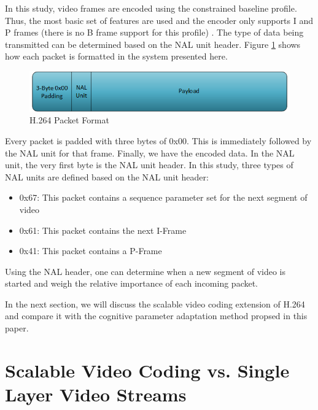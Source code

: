 \documentclass[3p,times,procedia]{elsarticle}
\begin{document}
In this study, video frames are encoded using the constrained baseline profile. Thus, the most basic set of features are used and the encoder only supports I and P frames (there is no B frame support for this profile) \cite{H264Spec}. The type of data being transmitted can be determined based on the NAL unit header. Figure \ref{fig:H264PacketFormat} shows how each packet is formatted in the system presented here.
\begin{figure}[H]
\centering
\includegraphics[width=0.6\linewidth]{H264HeaderFormat.png}
\caption{H.264 Packet Format}
\label{fig:H264PacketFormat}
\end{figure}
Every packet is padded with three bytes of 0x00. This is immediately followed by the NAL unit for that frame. Finally, we have the encoded data. In the NAL unit, the very first byte is the NAL unit header. In this study, three types of NAL units are defined based on the NAL unit header:
\begin{itemize}
\item 0x67: This packet contains a sequence parameter set for the next segment of video
\item 0x61: This packet contains the next I-Frame
\item 0x41: This packet contains a P-Frame
\end{itemize}
Using the NAL header, one can determine when a new segment of video is started and weigh the relative importance of each incoming packet. 

In the next section, we will discuss the scalable video coding extension of H.264 and compare it with the cognitive parameter adaptation method propsed in this paper.


\section{Scalable Video Coding vs. Single Layer Video Streams}
\label{sec:SVC}
\end{document}
